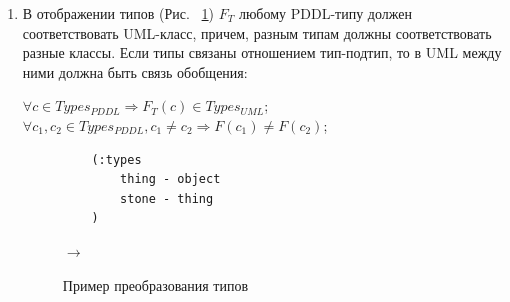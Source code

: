 \documentclass[a4paper,14pt]{extreport}
\begin{document}
    \begin{enumerate}
        \item В отображении типов (Рис.
~\ref{img:property-types}) $F_T$ любому PDDL-типу должен соответствовать UML-класс, причем, разным типам должны соответствовать разные классы.
 Если типы связаны отношением тип-подтип, то в UML между ними должна быть связь обобщения:
    
        \begin{center}
            $\forall c \in Types_{PDDL} \Rightarrow F_T(c) \in Types_{UML}$; \\
            $\forall c_1, c_2 \in Types_{PDDL}, c_1 \neq c_2 \Rightarrow F(c_1) \neq F(c_2)$;
        \end{center}
                 
        
\begin{figure}[!h]
    \hfill
    \begin{minipage}[h]{0.40\linewidth}
        {\raggedright
        \begin{verbatim}
    (:types
        thing - object
        stone - thing
    )
        \end{verbatim} 
        }
    \end{minipage}
    \hfill
    $\rightarrow$
    \hfill
    \begin{minipage}[h]{0.45\linewidth}
    \end{minipage}
    \caption{Пример преобразования типов}
    \label{img:property-types}
\end{figure}
   


\end{enumerate}
\end{document}
